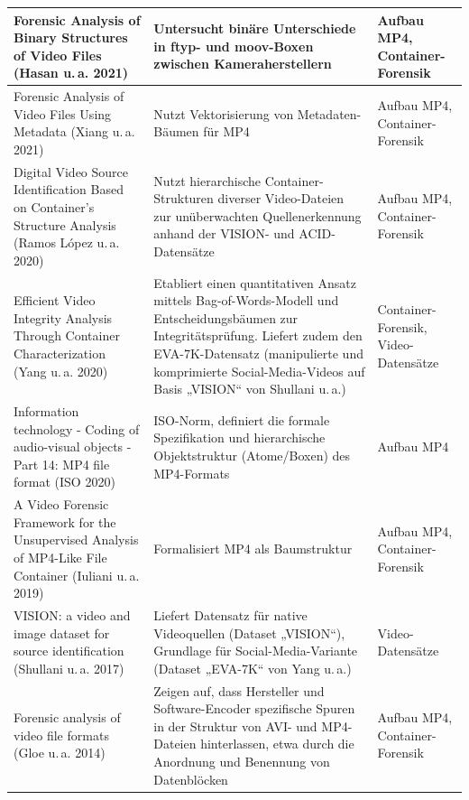 \begin{xltabular}{\textwidth}{L{4.5cm} X L{3.5cm}}
    Forensic Analysis of Binary Structures of Video Files (Hasan u.\,a. 2021)\cite{hasan_forensic_2021} & 
    Untersucht binäre Unterschiede in ftyp- und moov-Boxen zwischen Kameraherstellern & 
    Aufbau MP4, Container-Forensik \\ \midrule
    
    Forensic Analysis of Video Files Using Metadata (Xiang u.\,a. 2021)\cite{xiang_forensic_2021} & 
    Nutzt Vektorisierung von Metadaten-Bäumen für MP4 & 
    Aufbau MP4, Container-Forensik \\ \midrule
    
    Digital Video Source Identification Based on Container's Structure Analysis (Ramos López u.\,a. 2020)\cite{ramos_lopez_digital_2020} & 
    Nutzt hierarchische Container-Strukturen diverser Video-Dateien zur unüberwachten Quellenerkennung anhand der VISION- und ACID-Datensätze & 
    Aufbau MP4, Container-Forensik \\ \midrule
    
    Efficient Video Integrity Analysis Through Container Characterization (Yang u.\,a. 2020)\cite{yang_efficient_2020} & 
    Etabliert einen quantitativen Ansatz mittels Bag-of-Words-Modell und Entscheidungsbäumen zur Integritätsprüfung. Liefert zudem den EVA-7K-Datensatz (manipulierte und komprimierte Social-Media-Videos auf Basis „VISION“ von Shullani u.\,a.) & 
    Container-Forensik, Video-Datensätze \\ \midrule
    
    Information technology - Coding of audio-visual objects - Part 14: MP4 file format (ISO 2020)\cite{iso_14496-14_2020} & 
    ISO-Norm, definiert die formale Spezifikation und hierarchische Objektstruktur (Atome/Boxen) des MP4-Formats & 
    Aufbau MP4 \\ \midrule
    
    A Video Forensic Framework for the Unsupervised Analysis of MP4-Like File Container (Iuliani u.\,a. 2019)\cite{iuliani_video_2019} & 
    Formalisiert MP4 als Baumstruktur & 
    Aufbau MP4, Container-Forensik \\ \midrule
    
    VISION: a video and image dataset for source identification (Shullani u.\,a. 2017)\cite{shullani_vision_2017} & 
    Liefert Datensatz für native Videoquellen (Dataset „VISION“), Grundlage für Social-Media-Variante (Dataset „EVA-7K“ von Yang u.\,a.) & 
    Video-Datensätze \\ \midrule
    
    Forensic analysis of video file formats (Gloe u.\,a. 2014)\cite{gloe_forensic_2014} & 
    Zeigen auf, dass Hersteller und Software-Encoder spezifische Spuren in der Struktur von AVI- und MP4-Dateien hinterlassen, etwa durch die Anordnung und Benennung von Datenblöcken & 
    Aufbau MP4, Container-Forensik \\
    

\end{xltabular}